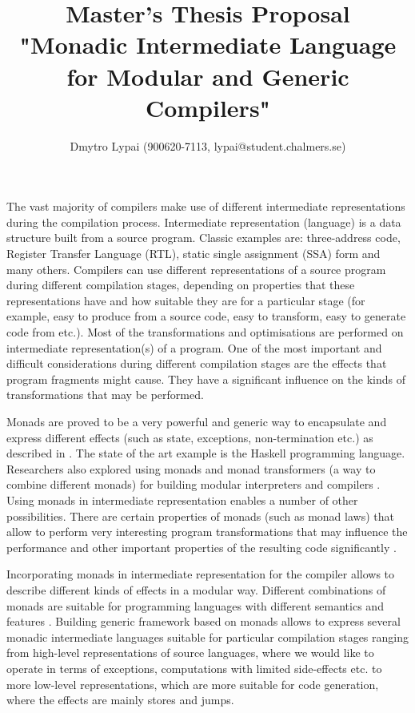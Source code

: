 \documentclass{article}
\title{Master's Thesis Proposal\\ "Monadic Intermediate Language for Modular and Generic Compilers"}
\author{Dmytro Lypai (900620-7113, lypai@student.chalmers.se)}
\begin{document}
\maketitle

The vast majority of compilers make use of different intermediate representations during the compilation process.
Intermediate representation (language) is a data structure built from a source program.
Classic examples are: three-address code, Register Transfer Language (RTL), static single assignment (SSA) form and many others.
Compilers can use different representations of a source program during different compilation stages, depending on properties that
these representations have and how suitable they are for a particular stage (for example, easy to produce from a source code,
easy to transform, easy to generate code from etc.).
Most of the transformations and optimisations are performed on intermediate representation(s) of a program.
One of the most important and difficult considerations during different compilation stages are the effects that program fragments
might cause. They have a significant influence on the kinds of transformations that may be performed.

Monads are proved to be a very powerful and generic way to encapsulate and express different effects
(such as state, exceptions, non-termination etc.) as described in \cite{MonadsAndEffects, MonadsForFP}.
The state of the art example is the Haskell programming language.
Researchers also explored using monads and monad transformers (a way to combine different monads)
for building modular interpreters and compilers \cite{MTandMI, MDSforCC, MConMT, TMCforE}.
Using monads in intermediate representation enables a number of other possibilities.
There are certain properties of monads (such as monad laws) that allow to perform very interesting program transformations
that may influence the performance and other important properties of the resulting code significantly \cite{MonadsEffectsAndTrans, OptML}.

Incorporating monads in intermediate representation for the compiler allows to describe different kinds of effects
in a modular way. Different combinations of monads are suitable for programming languages with different semantics and features \cite{BridgTheGulf}. Building generic framework based on monads allows to express several monadic intermediate languages
suitable for particular compilation stages ranging from high-level representations of source languages, where we would like
to operate in terms of exceptions, computations with limited side-effects etc.
to more low-level representations, which are more suitable for code generation, where the effects are mainly stores and jumps.
\end{document}
